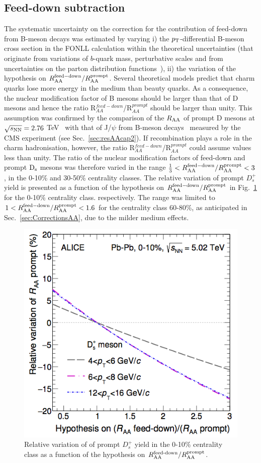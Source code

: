 \subsection{Feed-down subtraction}
\label{sec:FDsystAA}
The systematic uncertainty on the correction for the contribution of feed-down from 
B-meson decays was estimated by varying i)
the $p_{\rm T}$-differential B-meson cross section in the 
FONLL calculation within the theoretical uncertainties (that originate from variations of 
$b$-quark mass, perturbative scales and from uncertainties on the parton distribution functions~\cite{Cacciari:2012ny}), 
ii) the variation of the hypothesis on $R_{\rm AA}^{\rm  feed-down}/R_{\rm AA}^{\rm prompt} $. 
Several theoretical models predict that charm quarks lose more energy 
in the medium than beauty quarks. As a consequence, the nuclear modification 
factor of B mesons should be larger than that of D mesons and hence the ratio 
R$^{feed-down}_{AA}$/R$^{prompt}_{AA}$ should be larger than unity. 
This assumption was confirmed by the comparison of the $R_{\rm AA}$ of prompt D mesons at 
$\sqrt{s_{\rm NN}} = 2.76$ TeV~\cite{Adam:2015nna} with that of J/$\psi$ from B-meson decays~\cite{Khachatryan:2016ypw} 
measured by the CMS experiment (see Sec.~\ref{sec:resAAcap2}).
If recombination plays a role in the charm hadronisation, however,  
the ratio R$^{feed-down}_{AA}$/R$^{prompt}_{AA} $ could assume values 
less than unity. The ratio of the nuclear modification factors of feed-down and 
prompt ${\rm D_s}$ mesons was therefore varied in the range 
$\frac{1}{3} < R_{\rm AA}^{\rm  feed-down}/R_{\rm AA}^{\rm prompt} < 3$, in 
the 0-10\% and 30-50\% centrality classes.
The relative variation of prompt $D^+_s$ yield is presented as a function of the hypothesis on  
$R_{\rm AA}^{\rm  feed-down}/R_{\rm AA}^{\rm prompt}$ in Fig.~\ref{fig:promptAA}
for the 0-10\% centrality class. 
respectively. The range was limited to 
$1 < R_{\rm AA}^{\rm  feed-down} / R_{\rm AA}^{\rm prompt} < 1.6$ 
for the centrality class 60-80\%, as anticipated in Sec.~\ref{sec:CorrectionsAA},
due to the milder medium effects.
\begin{figure}[!h]
 \begin{center}
\includegraphics[width=.49\textwidth]{./FigCap5/RaaVariationVsRbHypo.png}
\end{center}
 \caption{Relative variation of of prompt $D^+_s$ yield in the 0-10\% centrality class as a function of the hypothesis on $R_{\rm AA}^{\textnormal{feed-down}}/R_{\rm AA}^{\rm prompt}$.}
 \label{fig:promptAA}
\end{figure}



